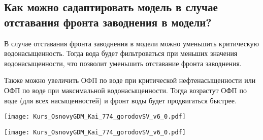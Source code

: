 

\subsection{Как можно садаптировать модель в случае отставания фронта заводнения в модели?}

В случае отставания фронта заводнения в модели можно уменьшить критическую водонасыщенность.
Тогда вода будет фильтроваться при меньших значения водонасыщенности, что позволит уменьшить отставание фронта заводнения.

Также можно увеличить ОФП по воде при критической нефтенасыщенности или ОФП по воде при максимальной водонасыщенности.
Тогда возрастут ОФП по воде (для всех насыщенностей) и фронт воды будет продвигаться быстрее.

\texttt{[image: Kurs\_OsnovyGDM\_Kai\_774\_gorodovSV\_v6\_0.pdf]}

\texttt{[image: Kurs\_OsnovyGDM\_Kai\_774\_gorodovSV\_v6\_0.pdf]}


